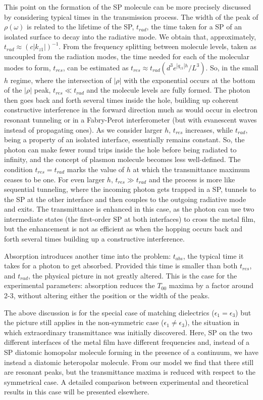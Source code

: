 This point on the formation of the SP molecule can be more precisely
discussed by considering typical times in the transmission
process. The width of the peak of $\rho(\omega)$ is related to the lifetime
of the SP, $t_{rad}$, the time taken for a SP of an isolated
surface to decay into the radiative mode. We obtain that, approximately, 
$t_{rad}\approx (c |k_{z1}|)^{-1}$\cite{caution}. From the frequency splitting
between molecule levels, taken as uncoupled from the radiation modes, the time
needed for each of the molecular modes to form, $t_{res}$, can be
estimated\cite{caution} 
as $t_{res} \approx t_{rad} (d^3 e^{|q_{z1}| h}/L^3)$.
So, in the small $h$ regime, 
where the intersection of $|\rho|$ with the
exponential occurs at the bottom of the $|\rho|$ peak, 
$t_{res}\ll t_{rad}$ and the
molecule levels are fully formed. The photon then goes back and forth several
times inside the hole, building up coherent constructive
interference in the forward direction
much as would occur in electron resonant tunneling or in a
Fabry-Perot interferometer (but with evanescent waves instead of
propagating ones). As we consider larger $h$, $t_{res}$ increases, while $%
t_{rad}$, being a property of an isolated interface, essentially 
remains constant. So, the photon can make fewer round trips inside 
the hole before being radiated
to infinity, and the concept of plasmon molecule becomes less
well-defined. The
condition $t_{res}=t_{rad}$ marks the value of $h$ at which the
transmittance maximum ceases to be one. For even larger $h$, 
$t_{res} \gg t_{rad}$ and the
process is more like sequential tunneling, where the incoming photon gets
trapped in a SP, tunnels to the SP at the other interface and then couples
to the outgoing radiative mode and exits. The
transmittance is enhanced in this
case, as the photon can use two intermediate states (the first-order SP at both
interfaces) to cross the metal film, but the enhancement is not as efficient
as when the hopping occurs back and forth several times
building up a constructive interference.

Absorption introduces another time into the problem: $t_{abs}$, the typical
time it takes for a photon to get absorbed. Provided this time is smaller
than both $t_{res}$, and $t_{rad}$, the physical picture in not greatly
altered. This is the case for the experimental parameters:
absorption reduces the $T_{00}$ maxima by a factor around 2-3, without
altering either the position or the width of the peaks.

The above discussion is for the special case of matching dielectrics
($\epsilon_1 = \epsilon_3$) but the
picture still applies in the non-symmetric case ($\epsilon_1 \ne
\epsilon_3$), 
the situation in which extraordinary transmittance was
initially discovered. Here, SP on the two different interfaces of the
metal film have different frequencies and, instead of a SP diatomic
homopolar molecule forming in the presence of a continuum, 
we have instead a diatomic heteropolar molecule. From our model we find 
that there still are resonant peaks, but the transmittance maxima is reduced
with respect to the symmetrical case. 
A detailed comparison between experimental and theoretical
results in this case will be presented elsewhere.


